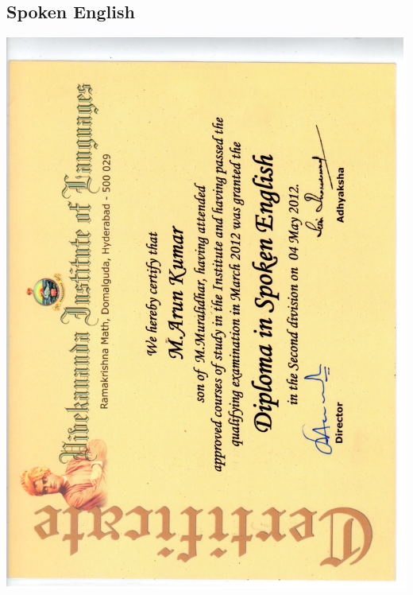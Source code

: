 \documentclass{article}
\begin{document}
	\subsection{Spoken English}
		\includegraphics[page=1, scale=0.5]{proofs/spoken_eng.pdf}\\
	
\end{document}
